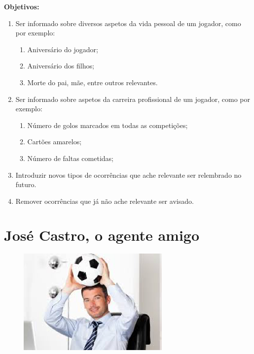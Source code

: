 \textbf{Objetivos:}
\begin{enumerate}
    \item Ser informado sobre diversos aspetos da vida pessoal de um jogador, como por exemplo:
    \begin{enumerate}
        \item Aniversário do jogador;
        \item Aniversário dos filhos;
        \item Morte do pai, mãe, entre outros relevantes.
    \end{enumerate}
    \item Ser informado sobre aspetos da carreira profissional de um jogador, como por exemplo:
    \begin{enumerate}
        \item Número de golos marcados em todas as competições;
        \item Cartões amarelos;
        \item Número de faltas cometidas;
    \end{enumerate}
    \item Introduzir novos tipos de ocorrências que ache relevante ser relembrado no futuro.
    \item Remover ocorrências que já não ache relevante ser avisado.
\end{enumerate}

\section{José Castro, o agente amigo}

\begin{figure}[H]
    \includegraphics[scale=1]{img/agente.png}
\end{figure}

